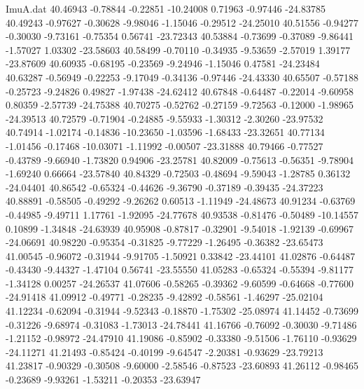 \begin{filecontents}{ImuA.dat}
  40.46943   -0.78844   -0.22851  -10.24008    0.71963   -0.97446  -24.83785
  40.49243   -0.97627   -0.30628   -9.98046   -1.15046   -0.29512  -24.25010
  40.51556   -0.94277   -0.30030   -9.73161   -0.75354    0.56741  -23.72343
  40.53884   -0.73699   -0.37089   -9.86441   -1.57027    1.03302  -23.58603
  40.58499   -0.70110   -0.34935   -9.53659   -2.57019    1.39177  -23.87609
  40.60935   -0.68195   -0.23569   -9.24946   -1.15046    0.47581  -24.23484
  40.63287   -0.56949   -0.22253   -9.17049   -0.34136   -0.97446  -24.43330
  40.65507   -0.57188   -0.25723   -9.24826    0.49827   -1.97438  -24.62412
  40.67848   -0.64487   -0.22014   -9.60958    0.80359   -2.57739  -24.75388
  40.70275   -0.52762   -0.27159   -9.72563   -0.12000   -1.98965  -24.39513
  40.72579   -0.71904   -0.24885   -9.55933   -1.30312   -2.30260  -23.97532
  40.74914   -1.02174   -0.14836  -10.23650   -1.03596   -1.68433  -23.32651
  40.77134   -1.01456   -0.17468  -10.03071   -1.11992   -0.00507  -23.31888
  40.79466   -0.77527   -0.43789   -9.66940   -1.73820    0.94906  -23.25781
  40.82009   -0.75613   -0.56351   -9.78904   -1.69240    0.66664  -23.57840
  40.84329   -0.72503   -0.48694   -9.59043   -1.28785    0.36132  -24.04401
  40.86542   -0.65324   -0.44626   -9.36790   -0.37189   -0.39435  -24.37223
  40.88891   -0.58505   -0.49292   -9.26262    0.60513   -1.11949  -24.48673
  40.91234   -0.63769   -0.44985   -9.49711    1.17761   -1.92095  -24.77678
  40.93538   -0.81476   -0.50489  -10.14557    0.10899   -1.34848  -24.63939
  40.95908   -0.87817   -0.32901   -9.54018   -1.92139   -0.69967  -24.06691
  40.98220   -0.95354   -0.31825   -9.77229   -1.26495   -0.36382  -23.65473
  41.00545   -0.96072   -0.31944   -9.91705   -1.50921    0.33842  -23.44101
  41.02876   -0.64487   -0.43430   -9.44327   -1.47104    0.56741  -23.55550
  41.05283   -0.65324   -0.55394   -9.81177   -1.34128    0.00257  -24.26537
  41.07606   -0.58265   -0.39362   -9.60599   -0.64668   -0.77600  -24.91418
  41.09912   -0.49771   -0.28235   -9.42892   -0.58561   -1.46297  -25.02104
  41.12234   -0.62094   -0.31944   -9.52343   -0.18870   -1.75302  -25.08974
  41.14452   -0.73699   -0.31226   -9.68974   -0.31083   -1.73013  -24.78441
  41.16766   -0.76092   -0.30030   -9.71486   -1.21152   -0.98972  -24.47910
  41.19086   -0.85902   -0.33380   -9.51506   -1.76110   -0.93629  -24.11271
  41.21493   -0.85424   -0.40199   -9.64547   -2.20381   -0.93629  -23.79213
  41.23817   -0.90329   -0.30508   -9.60000   -2.58546   -0.87523  -23.60893
  41.26112   -0.98465   -0.23689   -9.93261   -1.53211   -0.20353  -23.63947

\end{filecontents}
